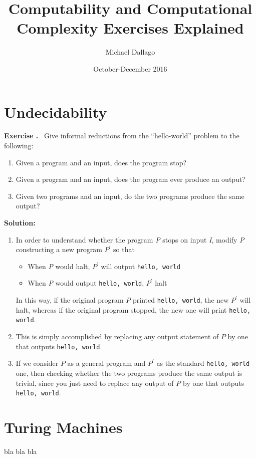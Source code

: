 \documentclass[titlepage]{article}
\title{Computability and Computational Complexity Exercises Explained}
\author{Michael Dallago}
\date{October-December 2016}
\newcounter{exercise}
\newcounter{solution}
\newcommand\Exercise{%
	\stepcounter{exercise}%
	\textbf{Exercise \theexercise.}~%
	\setcounter{solution}{0}%
}
\newcommand\TheSolution{%
	\textbf{Solution:}\\%
}
\begin{document}
\maketitle

\section{Undecidability}
\Exercise  Give informal reductions from the “hello-world” problem to the following:
\begin{enumerate}
	\item Given a program and an input, does the program stop?
	\item Given a program and an input, does the program ever produce an
	output?
	\item Given two programs and an input, do the two programs produce the
	same output?
\end{enumerate}

\TheSolution \begin{enumerate}
	\item In order to understand whether the program \textit{P} stops on input \textit{I}, modify \textit{P} constructing a new program $P^\prime$ so that
	\begin{itemize}
		\item When \textit{P} would halt, $P^\prime$ will output \texttt{hello, world}
		\item When \textit{P} would output \texttt{hello, world}, $P^\prime$ halt
	\end{itemize}
	In this way, if the original program $P$ printed \texttt{hello, world}, the new $P^\prime$ will halt, whereas if the original program stopped, the new one will print \texttt{hello, world}.
	
	\item This is simply accomplished by replacing any output statement of $P$ by one that outputs \texttt{hello, world}. 
	
	\item If we consider $ P $ as a general program and $ P^\prime $ as the standard \texttt{hello, world} one, then checking whether the two programs produce the same output is trivial, since you just need to replace any output of $ P $ by one that outputs \texttt{hello, world}.
\end{enumerate}

\clearpage

\section{Turing Machines}
bla bla bla
\end{document}
